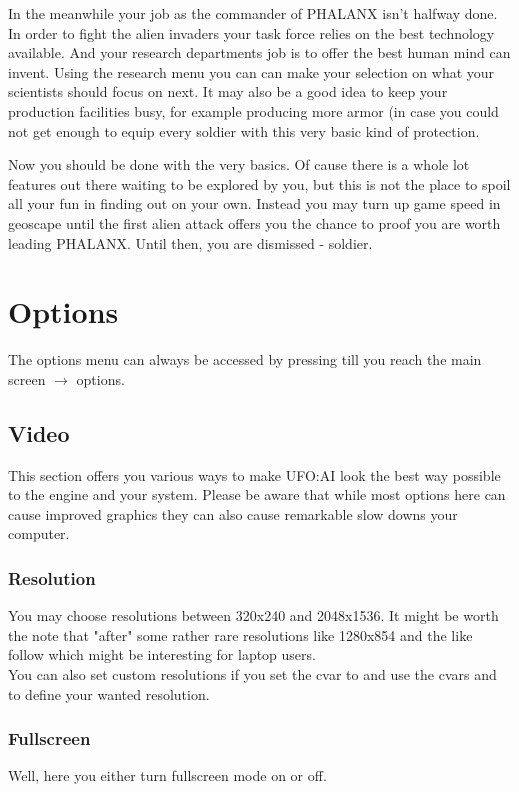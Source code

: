 In the meanwhile your job as the commander of PHALANX isn't halfway done. In order to fight the alien invaders your task force relies on the best technology available. And your research departments job is to offer the best human mind can invent. Using the research menu you can can make your selection on what your scientists should focus on next. It may also be a good idea to keep your production facilities busy, for example producing more armor (in case you could not get enough to equip every soldier with this very basic kind of protection.

Now you should be done with the very basics. Of cause there is a whole lot features out there waiting to be explored by you, but this is not the place to spoil all your fun in finding out on your own. Instead you may turn up game speed in geoscape until the first alien attack offers you the chance to proof you are worth leading PHALANX. Until then, you are dismissed - soldier.

\section{Options}
The options menu can always be accessed by pressing  till you reach the main screen $\rightarrow$ options.

\subsection{Video}
This section offers you various ways to make UFO:AI look the best way possible to the engine and your system. Please be aware that while most options here can cause improved graphics they can also cause remarkable slow downs your computer.
\subsubsection*{Resolution}
You may choose resolutions between 320x240 and 2048x1536. It might be worth the note that "after" some rather rare resolutions like 1280x854 and the like follow which might be interesting for laptop users.\\
You can also set custom resolutions if you set the cvar  to  and use the cvars  and  to define your wanted resolution.
\subsubsection*{Fullscreen}
Well, here you either turn fullscreen mode on or off.

